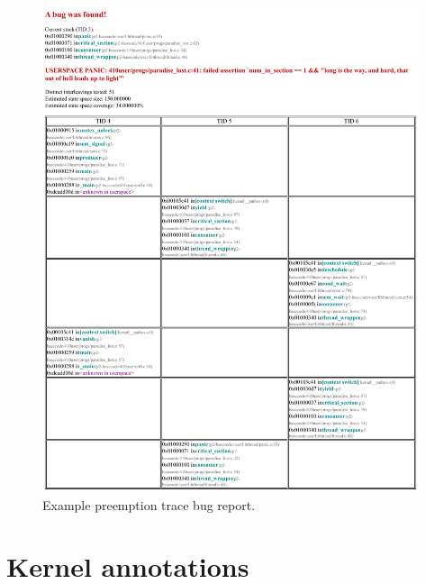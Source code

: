 \begin{figure}[h!]
	\begin{center}
		\includegraphics[width=0.985\textwidth]{bugreport.pdf}
	\end{center}
	\caption{Example preemption trace bug report.}
	\label{fig:bugreport}
\end{figure}


\section{Kernel annotations}
\label{sec:landslide-kernel-anno}

